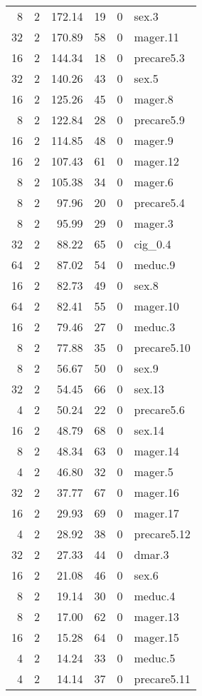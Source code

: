 \begin{table}[htbp]
\begin{tabular}{rrrrrl}
  8 & 2 & 172.14 & 19 & 0 & sex.3 \\ 
  32 & 2 & 170.89 & 58 & 0 & mager.11 \\ 
  16 & 2 & 144.34 & 18 & 0 & precare5.3 \\ 
  32 & 2 & 140.26 & 43 & 0 & sex.5 \\ 
  16 & 2 & 125.26 & 45 & 0 & mager.8 \\ 
  8 & 2 & 122.84 & 28 & 0 & precare5.9 \\ 
  16 & 2 & 114.85 & 48 & 0 & mager.9 \\ 
  16 & 2 & 107.43 & 61 & 0 & mager.12 \\ 
  8 & 2 & 105.38 & 34 & 0 & mager.6 \\ 
  8 & 2 & 97.96 & 20 & 0 & precare5.4 \\ 
  8 & 2 & 95.99 & 29 & 0 & mager.3 \\ 
  32 & 2 & 88.22 & 65 & 0 & cig_0.4 \\ 
  64 & 2 & 87.02 & 54 & 0 & meduc.9 \\ 
  16 & 2 & 82.73 & 49 & 0 & sex.8 \\ 
  64 & 2 & 82.41 & 55 & 0 & mager.10 \\ 
  16 & 2 & 79.46 & 27 & 0 & meduc.3 \\ 
  8 & 2 & 77.88 & 35 & 0 & precare5.10 \\ 
  8 & 2 & 56.67 & 50 & 0 & sex.9 \\ 
  32 & 2 & 54.45 & 66 & 0 & sex.13 \\ 
  4 & 2 & 50.24 & 22 & 0 & precare5.6 \\ 
  16 & 2 & 48.79 & 68 & 0 & sex.14 \\ 
  8 & 2 & 48.34 & 63 & 0 & mager.14 \\ 
  4 & 2 & 46.80 & 32 & 0 & mager.5 \\ 
  32 & 2 & 37.77 & 67 & 0 & mager.16 \\ 
  16 & 2 & 29.93 & 69 & 0 & mager.17 \\ 
  4 & 2 & 28.92 & 38 & 0 & precare5.12 \\ 
  32 & 2 & 27.33 & 44 & 0 & dmar.3 \\ 
  16 & 2 & 21.08 & 46 & 0 & sex.6 \\ 
  8 & 2 & 19.14 & 30 & 0 & meduc.4 \\ 
  8 & 2 & 17.00 & 62 & 0 & mager.13 \\ 
  16 & 2 & 15.28 & 64 & 0 & mager.15 \\ 
  4 & 2 & 14.24 & 33 & 0 & meduc.5 \\ 
  4 & 2 & 14.14 & 37 & 0 & precare5.11 \\ 

\end{tabular}
\end{table}
